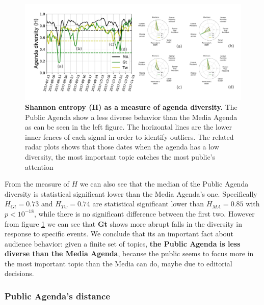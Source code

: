\begin{figure}[h]
\centering
\includegraphics[width = \textwidth]{images/Fig3.pdf}
\caption{\textbf{Shannon entropy (H) as a measure of agenda diversity.} The Public Agenda show a less diverse behavior than the Media Agenda as can be seen in the left figure. The horizontal lines are the lower inner fences of each signal in order to identify outliers. The related radar plots shows that those dates when the agenda has a low diversity, the most important topic catches the most public’s attention}
\label{fig:shannon_entropy_agendas}
\end{figure}

\par From the measure of $H$ we can also see that the median of the Public Agenda diversity is statistical significant lower than the Media Agenda's one.
Specifically $H_{Gt} = 0.73$ and $H_{Tw} = 0.74$ are statistical significant lower than $H_{MA} = 0.85$ with $p < 10^{-18}$, while there is no significant difference between the first two. 
However from figure \ref{fig:shannon_entropy_agendas} we can see that \textbf{Gt} shows more abrupt falls in the diversity in response to specific events.
We conclude that its an important fact about audience behavior: given a finite set of topics, \textbf{the Public Agenda is less diverse than the Media Agenda}, because the public seems to focus more in the most important topic than the Media can do, maybe due to editorial decisions.

\subsubsection{Public Agenda's distance}


